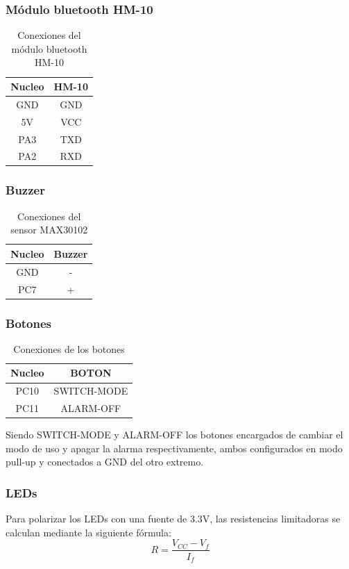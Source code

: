 \subsubsection{Módulo bluetooth HM-10}
\begin{table}[H]
\centering
\begin{tabular}{|c|c|}
\hline
Nucleo & HM-10 \\ \hline
GND & GND \\ \hline
5V & VCC \\ \hline
PA3 & TXD \\ \hline
PA2 & RXD \\ \hline
\end{tabular}
\caption{Conexiones del módulo bluetooth HM-10}
\end{table}

\subsubsection{Buzzer}
\begin{table}[H]
\centering
\begin{tabular}{|c|c|}
\hline
Nucleo & Buzzer \\ \hline
GND & - \\ \hline
PC7 & + \\ \hline

\end{tabular}
\caption{Conexiones del sensor MAX30102}
\end{table}

\subsubsection{Botones}
\begin{table}[H]
\centering
\begin{tabular}{|c|c|}
\hline
Nucleo & BOTON \\ \hline
PC10 & SWITCH-MODE \\ \hline
PC11 & ALARM-OFF \\ \hline
\end{tabular}
\caption{Conexiones de los botones}
\end{table}
Siendo SWITCH-MODE y ALARM-OFF los botones encargados de cambiar el modo de uso y apagar la alarma respectivamente, ambos configurados en modo pull-up y conectados a GND del otro extremo.

\subsubsection{LEDs}
Para polarizar los LEDs con una fuente de 3.3V, las resistencias limitadoras se calculan mediante la siguiente fórmula: 
\begin{equation}
    R = \frac{V_{CC}- V_f}{I_f}
\end{equation}

